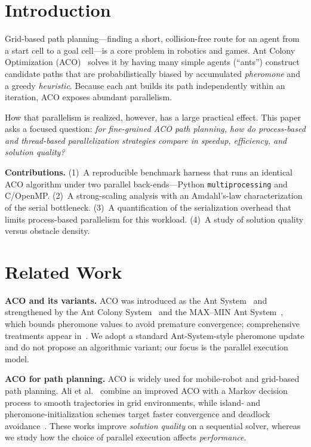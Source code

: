 \documentclass[conference]{IEEEtran}
\begin{document}
\section{Introduction}
Grid-based path planning---finding a short, collision-free route for an agent
from a start cell to a goal cell---is a core problem in robotics and games.
Ant Colony Optimization (ACO)~\cite{dorigo1996ant,dorigo2004aco} solves it by
having many simple agents (``ants'') construct candidate paths that are
probabilistically biased by accumulated \emph{pheromone} and a greedy
\emph{heuristic}. Because each ant builds its path independently within an
iteration, ACO exposes abundant parallelism.

How that parallelism is realized, however, has a large practical effect. This
paper asks a focused question: \emph{for fine-grained ACO path planning, how do
process-based and thread-based parallelization strategies compare in speedup,
efficiency, and solution quality?}

\textbf{Contributions.} (1)~A reproducible benchmark harness that runs an
identical ACO algorithm under two parallel back-ends---Python
\texttt{multiprocessing} and C/OpenMP. (2)~A strong-scaling analysis with an
Amdahl's-law characterization of the serial bottleneck. (3)~A quantification of
the serialization overhead that limits process-based parallelism for this
workload. (4)~A study of solution quality versus obstacle density.

\section{Related Work}
\label{sec:related}
\textbf{ACO and its variants.} ACO was introduced as the Ant
System~\cite{dorigo1996ant} and strengthened by the Ant Colony
System~\cite{dorigo1997acs} and the MAX--MIN Ant System~\cite{stutzle2000maxmin},
which bounds pheromone values to avoid premature convergence; comprehensive
treatments appear in~\cite{dorigo2004aco,dorigo2006aco}. We adopt a standard
Ant-System-style pheromone update and do not propose an algorithmic variant; our
focus is the parallel execution model.

\textbf{ACO for path planning.} ACO is widely used for mobile-robot and
grid-based path planning. Ali et al.~\cite{ali2020pathplanning} combine an
improved ACO with a Markov decision process to smooth trajectories in grid
environments, while island- and pheromone-initialization schemes target faster
convergence and deadlock avoidance~\cite{li2024islands}. These works improve
\emph{solution quality} on a sequential solver, whereas we study how the choice of
parallel execution affects \emph{performance}.
\end{document}
